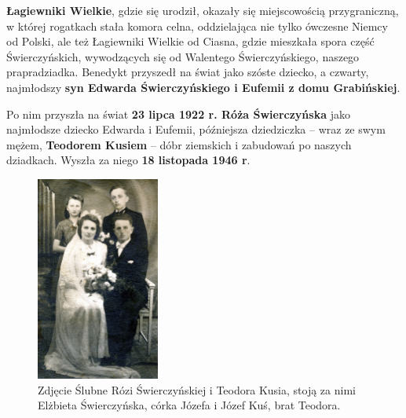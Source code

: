 \textbf{Łagiewniki Wielkie}, gdzie się urodził, okazały się miejscowością przygraniczną, w której rogatkach stała komora celna, oddzielająca nie tylko ówczesne Niemcy od Polski, ale też Łagiewniki Wielkie od Ciasna, gdzie mieszkała spora część Świerczyńskich, wywodzących się od Walentego Świerczyńskiego, naszego prapradziadka. Benedykt przyszedł na świat jako szóste dziecko, a czwarty, najmłodszy \textbf{syn Edwarda Świerczyńskiego i Eufemii z domu Grabińskiej}.

Po nim przyszła na świat \textbf{23 lipca 1922 r. Róża Świerczyńska} jako najmłodsze dziecko Edwarda i Eufemii, późniejsza dziedziczka -- wraz ze swym mężem, \textbf{Teodorem Kusiem} -- dóbr ziemskich i zabudowań po naszych dziadkach. Wyszła za niego \textbf{18 listopada 1946 r}.
\begin{figure}[!h]
\begin{center}
\includegraphics[width=0.36\textwidth]{photo/rozia_teodor_kus_slub.jpg}
\caption[Zdjęcie Ślubne Rózi Świerczyńskiej i Teodora Kusia]{Zdjęcie Ślubne Rózi Świerczyńskiej i Teodora Kusia, stoją za nimi Elżbieta Świerczyńska, córka Józefa i Józef Kuś, brat Teodora.}
\label{rys:rozia_teodor_kus_slub}
\end{center}
\end{figure}

